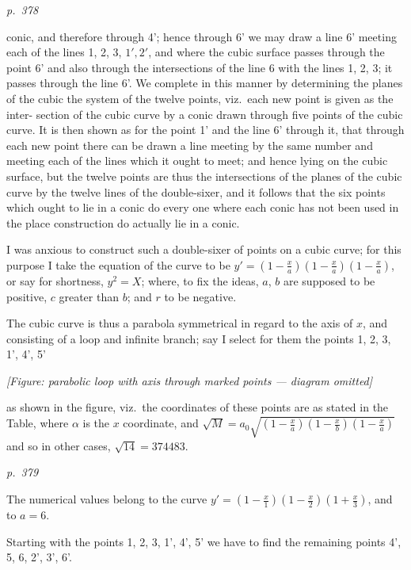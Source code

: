 \documentclass[11pt,a4paper]{article}
\theoremstyle{plain}
\theoremstyle{definition}
\begin{document}
\bigskip
\textit{p.~378}
\smallskip

\noindent
conic, and therefore through 4'; hence through 6' we may draw a line 6' meeting
each of the lines 1, 2, 3, $1', 2'$, and where the cubic surface passes through the point 6'
and also through the intersections of the line 6 with the lines 1, 2, 3; it passes
through the line 6'.  We complete in this manner by determining the planes of
the cubic the system of the twelve points, viz.\ each new point is given as the inter-
section of the cubic curve by a conic drawn through five points of the cubic curve.
It is then shown as for the point 1' and the line 6' through it, that through each
new point there can be drawn a line meeting by the same number and meeting each
of the lines which it ought to meet; and hence lying on the cubic surface, but the
twelve points are thus the intersections of the planes of the cubic curve by the twelve
lines of the double-sixer, and it follows that the six points which ought to lie in
a conic do every one where each conic has not been used in the place construction
do actually lie in a conic.

I was anxious to construct such a double-sixer of points on a cubic curve; for
this purpose I take the equation of the curve to be $y' = (1 - \frac{x}{a})(1 - \frac{x}{a})(1 - \frac{x}{a})$, or
say for shortness, $y^2 = X$; where, to fix the ideas, $a$, $b$ are supposed to be positive,
$c$ greater than $b$; and $r$ to be negative.

The cubic curve is thus a parabola symmetrical in regard to the axis of $x$, and
consisting of a loop and infinite branch; say I select for them the points 1, 2, 3, 1', 4', 5'
\begin{center}
\textit{[Figure: parabolic loop with axis through marked points --- diagram omitted]}
\end{center}
as shown in the figure, viz.\ the coordinates of these points are as stated in the
Table, where $\alpha$ is the $x$ coordinate, and $\sqrt{M} = a_0 \sqrt{\left(1 - \frac{x}{a}\right)\left(1 - \frac{x}{b}\right)\left(1 - \frac{x}{a}\right)}$ and so in
other cases, $\sqrt{14} = 374483$.

\clearpage

\bigskip
\textit{p.~379}
\smallskip

\noindent
The numerical values belong to the curve $y' = \left(1 - \frac{x}{1}\right)\left(1 - \frac{x}{2}\right)\left(1 + \frac{x}{3}\right)$, and to $a = 6$.

Starting with the points 1, 2, 3, 1', 4', 5' we have to find the remaining points
4', 5, 6, 2', 3', 6'.
\end{document}

